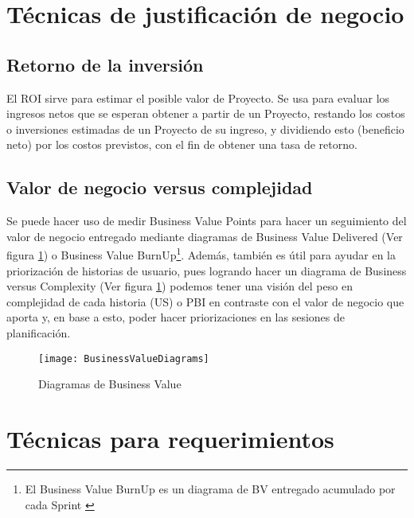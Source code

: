 \newpage
\section{Técnicas de justificación de negocio}

\subsection{Retorno de la inversión}

El ROI sirve para estimar el posible valor de Proyecto. Se usa para evaluar los ingresos netos que se esperan obtener a partir de un Proyecto, restando los costos o inversiones estimadas de un Proyecto de su ingreso, y dividiendo esto (beneficio neto) por los costos previstos, con el fin de obtener una tasa de retorno. 

\subsection{Valor de negocio versus complejidad}

Se puede hacer uso de medir Business Value Points para hacer un seguimiento del valor de negocio entregado mediante diagramas de Business Value Delivered (Ver figura \ref{fig:BusinessValueDiagrams}) o Business Value BurnUp\footnote{El Business Value BurnUp es un diagrama de BV entregado acumulado por cada Sprint \cite{Scrum-Alliance-2005}}. Además, también es útil para ayudar en la priorización de historias de usuario, pues logrando hacer un diagrama de Business versus Complexity (Ver figura \ref{fig:BusinessValueDiagrams}) podemos tener una visión del peso en complejidad de cada historia (US) o PBI en contraste con el valor de negocio que aporta y, en base a esto, poder hacer priorizaciones en las sesiones de planificación.

\begin{figure}[h]
  \centering
  \texttt{[image: BusinessValueDiagrams]}
  \caption{Diagramas de Business Value}
  \centering
  \label{fig:BusinessValueDiagrams} %
\end{figure}
\FloatBarrier %

\newpage
\section{Técnicas para requerimientos}

